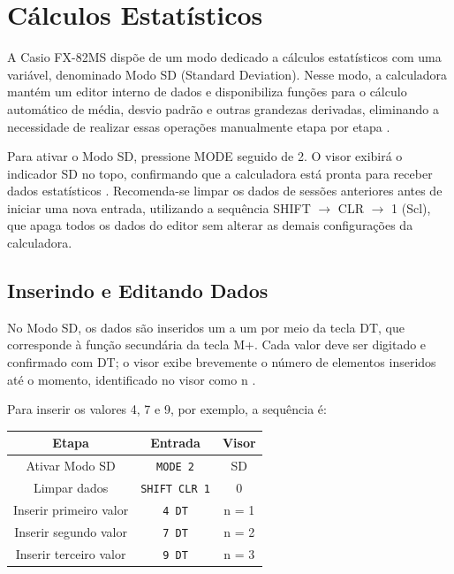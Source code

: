 \chapter{Cálculos Estatísticos}

A Casio FX-82MS dispõe de um modo dedicado a cálculos estatísticos com uma variável, denominado Modo SD (Standard Deviation). Nesse modo, a calculadora mantém um editor interno de dados e disponibiliza funções para o cálculo automático de média, desvio padrão e outras grandezas derivadas, eliminando a necessidade de realizar essas operações manualmente etapa por etapa \cite{casio2004}.

Para ativar o Modo SD, pressione MODE seguido de 2. O visor exibirá o indicador SD no topo, confirmando que a calculadora está pronta para receber dados estatísticos \cite{casio2004}. Recomenda-se limpar os dados de sessões anteriores antes de iniciar uma nova entrada, utilizando a sequência SHIFT $\to$ CLR $\to$ 1 (Scl), que apaga todos os dados do editor sem alterar as demais configurações da calculadora.

\section{Inserindo e Editando Dados}

No Modo SD, os dados são inseridos um a um por meio da tecla DT, que corresponde à função secundária da tecla M+. Cada valor deve ser digitado e confirmado com DT; o visor exibe brevemente o número de elementos inseridos até o momento, identificado no visor como n \cite{casio2004}.

Para inserir os valores 4, 7 e 9, por exemplo, a sequência é:

\begin{table}[H]
    \centering
    \begin{tabular}{|c|c|c|}
        \hline
        \textbf{Etapa} & \textbf{Entrada} & \textbf{Visor} \\ \hline
        Ativar Modo SD & \texttt{MODE 2} & SD \\
        Limpar dados & \texttt{SHIFT CLR 1} & 0 \\
        Inserir primeiro valor & \texttt{4 DT} & n = 1 \\
        Inserir segundo valor & \texttt{7 DT} & n = 2 \\
        Inserir terceiro valor & \texttt{9 DT} & n = 3 \\ \hline
    \end{tabular}
\end{table}

